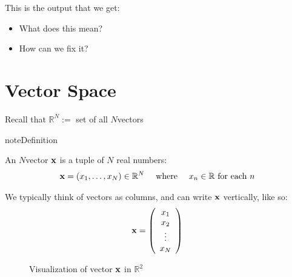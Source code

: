 \documentclass[letterpaper,10pt,english]{jupyterBook}
\begin{document}
\sphinxAtStartPar
This is the output that we get:
\begin{itemize}
\item {} 
\sphinxAtStartPar
What does this mean?

\item {} 
\sphinxAtStartPar
How can we fix it?

\end{itemize}

\sphinxAtStartPar
{}


\section{Vector Space}
\label{\detokenize{05.linear_algebra:vector-space}}
\sphinxAtStartPar
Recall that \(\mathbb{R}^N := \) set of all \(N\)\sphinxhyphen{}vectors

\begin{sphinxadmonition}{note}{Definition}

\sphinxAtStartPar
An \(N\)\sphinxhyphen{}vector \({\bf x}\) is a tuple of \(N\) real numbers:
\begin{equation*}
\begin{split}
{\bf x} = (x_1, \ldots, x_N) \in \mathbb{R}^N
\quad
\text{ where } 
\quad x_n \in \mathbb{R} \text{ for each } n
\end{split}
\end{equation*}\end{sphinxadmonition}

\sphinxAtStartPar
We typically think of vectors as columns, and can write \({\bf x}\) vertically, like so:
\begin{equation*}
\begin{split}
%
{\bf x} = 
\left(
\begin{array}{c}
x_1 \\
x_2 \\
\vdots \\
x_N
\end{array}
\right)
%
\end{split}
\end{equation*}
\begin{figure}[htbp]
\centering
\capstart

\noindent{}
\caption{Visualization of vector \({\bf x}\) in \(\mathbb{R}^2\)}\label{\detokenize{05.linear_algebra:f-vec}}\end{figure}
\end{document}
